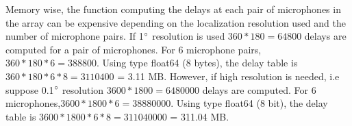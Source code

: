 Memory wise, the function computing the delays at each pair of microphones in the array can be expensive depending on the localization resolution used and the number of microphone pairs. If 1$\degree$ resolution is used $360*180=64800$ delays are computed for a pair of microphones. For 6 microphone pairs,$360*180*6=388800$.  Using type float64 (8 bytes), the delay table is  $360*180*6*8=3110400$ = 3.11 MB. However, if high resolution is needed, i.e suppose 0.1$\degree$ resolution $3600*1800=6480000$ delays are computed. For 6 microphones,$3600*1800*6=38880000$.  Using type float64 (8 bit), the delay table is  $3600*1800*6*8=311040000$ = 311.04 MB.